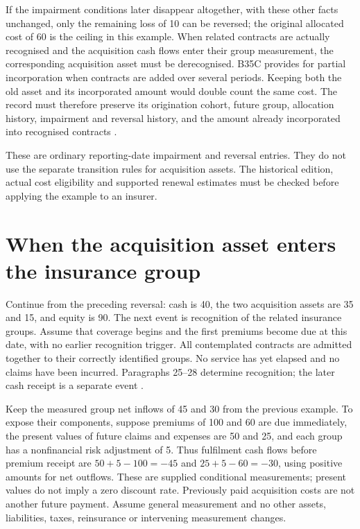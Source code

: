 If the impairment conditions later disappear altogether, with these other
facts unchanged, only the remaining loss of 10 can be reversed; the original
allocated cost of 60 is the ceiling in this example. When related contracts
are actually recognised and the acquisition cash flows enter their group
measurement, the corresponding acquisition asset must be derecognised.
B35C provides for partial incorporation when contracts are added over several
periods. Keeping both the old asset and its incorporated amount would double
count the same cost. The record must therefore preserve its origination cohort,
future group, allocation history, impairment and reversal history, and the
amount already incorporated into recognised contracts
\citep[paragraphs 28C--28F and B35B--B35C]{aasb17}.

These are ordinary reporting-date impairment and reversal entries. They do
not use the separate transition rules for acquisition assets. The historical
edition, actual cost eligibility and supported renewal estimates must be
checked before applying the example to an insurer.

\clearpage
\section{When the acquisition asset enters the insurance group}
\label{sec:insurance-acquisition-incorporation}

Continue from the preceding reversal: cash is 40, the two acquisition assets
are 35 and 15, and equity is 90. The next event is recognition of the related
insurance groups. Assume that coverage begins and the first premiums become
due at this date, with no earlier recognition trigger. All contemplated
contracts are admitted together to their correctly identified groups. No
service has yet elapsed and no claims have been incurred. Paragraphs 25--28
determine recognition; the later cash receipt is a separate event
\citep[paragraphs 25--28]{aasb17}.

Keep the measured group net inflows of 45 and 30 from the previous example.
To expose their components, suppose premiums of 100 and 60 are due immediately,
the present values of future claims and expenses are 50 and 25, and each
group has a nonfinancial risk adjustment of 5. Thus fulfilment cash flows
before premium receipt are $50+5-100=-45$ and $25+5-60=-30$, using positive
amounts for net outflows. These are supplied conditional measurements;
present values do not imply a zero discount rate. Previously paid acquisition
costs are not another future payment. Assume general measurement and no other
assets, liabilities, taxes, reinsurance or intervening measurement changes.

